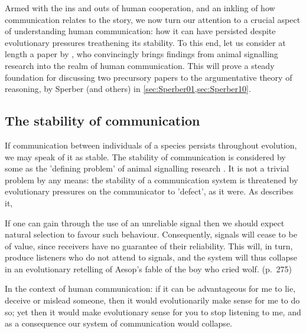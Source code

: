Armed with the ins and outs of human cooperation, and an inkling of how communication relates to the story, we now turn our attention to a crucial aspect of understanding human communication: how it can have persisted despite evolutionary pressures treathening its stability. To this end, let us consider at length a paper by \citet{Scott-Phillips08}, who convincingly brings findings from animal signalling research into the realm of human communication. This will prove a steady foundation for discussing two precursory papers to the argumentative theory of reasoning, by Sperber (and others) in \cref{sec:Sperber01,sec:Sperber10}.

\subsection{The stability of communication}
\label{sec:S-P08}



If communication between individuals of a species persists throughout evolution, we may speak of it as stable. The stability of communication is considered by some as the 'defining problem' of animal signalling research \citep{Scott-Phillips08}. It is not a trivial problem by any means: the stability of a communication system is threatened by evolutionary pressures on the communicator to 'defect', as it were. As \citet{Scott-Phillips08} describes it,
\begin{quoting}
    If one can gain through the use of an unreliable signal then we should expect natural selection to favour such behaviour. Consequently, signals will cease to be of value, since receivers have no guarantee of their reliability. This will, in turn, produce listeners who do not attend to signals, and the system will thus collapse in an evolutionary retelling of Aesop’s fable of the boy who cried wolf.
    \hfill (p.~275)
\end{quoting}
In the context of human communication: if it can be advantageous for me to lie, deceive or mislead someone, then it would evolutionarily make sense for me to do so; yet then it would make evolutionary sense for you to stop listening to me, and as a consequence our system of communication would collapse.

